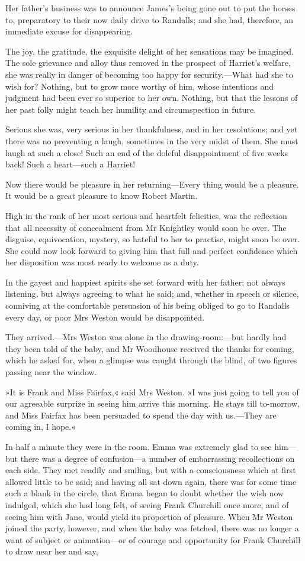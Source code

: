 Her father's business was to announce James's being gone out to put the horses to, preparatory to their now daily drive to Randalls; and she had, therefore, an immediate excuse for disappearing.

The joy, the gratitude, the exquisite delight of her sensations may be imagined. The sole grievance and alloy thus removed in the prospect of Harriet's welfare, she was really in danger of becoming too happy for security.—What had she to wish for? Nothing, but to grow more worthy of him, whose intentions and judgment had been ever so superior to her own. Nothing, but that the lessons of her past folly might teach her humility and circumspection in future.

Serious she was, very serious in her thankfulness, and in her resolutions; and yet there was no preventing a laugh, sometimes in the very midst of them. She must laugh at such a close! Such an end of the doleful disappointment of five weeks back! Such a heart—such a Harriet!

Now there would be pleasure in her returning—Every thing would be a pleasure. It would be a great pleasure to know Robert Martin.

High in the rank of her most serious and heartfelt felicities, was the reflection that all necessity of concealment from Mr Knightley would soon be over. The disguise, equivocation, mystery, so hateful to her to practise, might soon be over. She could now look forward to giving him that full and perfect confidence which her disposition was most ready to welcome as a duty.

In the gayest and happiest spirits she set forward with her father; not always listening, but always agreeing to what he said; and, whether in speech or silence, conniving at the comfortable persuasion of his being obliged to go to Randalls every day, or poor Mrs Weston would be disappointed.

They arrived.—Mrs Weston was alone in the drawing-room:—but hardly had they been told of the baby, and Mr Woodhouse received the thanks for coming, which he asked for, when a glimpse was caught through the blind, of two figures passing near the window.

»It is Frank and Miss Fairfax,« said Mrs Weston. »I was just going to tell you of our agreeable surprize in seeing him arrive this morning. He stays till to-morrow, and Miss Fairfax has been persuaded to spend the day with us.—They are coming in, I hope.«

In half a minute they were in the room. Emma was extremely glad to see him—but there was a degree of confusion—a number of embarrassing recollections on each side. They met readily and smiling, but with a consciousness which at first allowed little to be said; and having all sat down again, there was for some time such a blank in the circle, that Emma began to doubt whether the wish now indulged, which she had long felt, of seeing Frank Churchill once more, and of seeing him with Jane, would yield its proportion of pleasure. When Mr Weston joined the party, however, and when the baby was fetched, there was no longer a want of subject or animation—or of courage and opportunity for Frank Churchill to draw near her and say,

